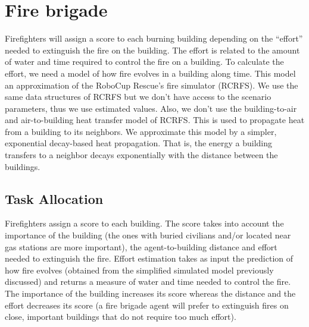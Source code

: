 \section{Fire brigade}
\label{sec:firefighters}

Firefighters will assign a score to each burning building depending on the ``effort'' needed to extinguish the fire on the building. The effort is related to the amount of water and time required to control the fire on a building. To calculate the effort, we need a model of how fire evolves in a building along time. This model an approximation of the RoboCup Rescue's fire simulator (RCRFS). We use the same data structures of RCRFS but we don't have access to the scenario parameters, thus we use estimated values. Also, we don't use the building-to-air and air-to-building heat transfer model of RCRFS. This is used to propagate heat from a building to its neighbors. We approximate this model by a simpler, exponential decay-based heat propagation. That is, the energy a building transfers to a neighbor decays exponentially with the distance between the buildings. %


\subsection{Task Allocation}

Firefighters assign a score to each building. The score takes into account the importance of the building (the ones with buried civilians and/or located near gas stations are more important), the agent-to-building distance and effort needed to extinguish the fire. Effort estimation takes as input the prediction of how fire evolves (obtained from the simplified simulated model previously discussed) and returns a measure of water and time needed to control the fire. The importance of the building increases its score whereas the distance and the effort decreases its score (a fire brigade agent will prefer to extinguish fires on close, important buildings that do not require too much effort). %

